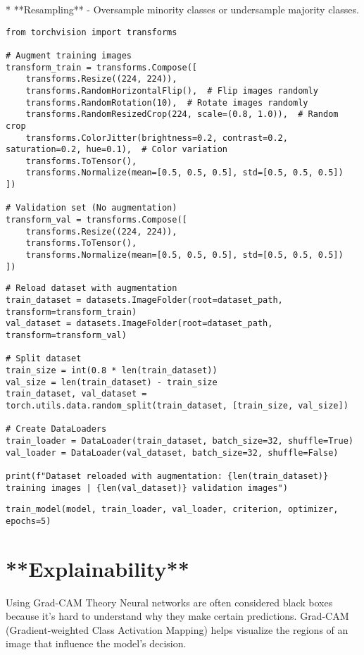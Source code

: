 \documentclass{article}
\begin{document}
*  **Resampling** - Oversample minority classes or undersample majority classes.

\begin{verbatim}
from torchvision import transforms

# Augment training images
transform_train = transforms.Compose([
    transforms.Resize((224, 224)),
    transforms.RandomHorizontalFlip(),  # Flip images randomly
    transforms.RandomRotation(10),  # Rotate images randomly
    transforms.RandomResizedCrop(224, scale=(0.8, 1.0)),  # Random crop
    transforms.ColorJitter(brightness=0.2, contrast=0.2, saturation=0.2, hue=0.1),  # Color variation
    transforms.ToTensor(),
    transforms.Normalize(mean=[0.5, 0.5, 0.5], std=[0.5, 0.5, 0.5])
])

# Validation set (No augmentation)
transform_val = transforms.Compose([
    transforms.Resize((224, 224)),
    transforms.ToTensor(),
    transforms.Normalize(mean=[0.5, 0.5, 0.5], std=[0.5, 0.5, 0.5])
])
\end{verbatim}

\begin{verbatim}
# Reload dataset with augmentation
train_dataset = datasets.ImageFolder(root=dataset_path, transform=transform_train)
val_dataset = datasets.ImageFolder(root=dataset_path, transform=transform_val)

# Split dataset
train_size = int(0.8 * len(train_dataset))
val_size = len(train_dataset) - train_size
train_dataset, val_dataset = torch.utils.data.random_split(train_dataset, [train_size, val_size])

# Create DataLoaders
train_loader = DataLoader(train_dataset, batch_size=32, shuffle=True)
val_loader = DataLoader(val_dataset, batch_size=32, shuffle=False)

print(f"Dataset reloaded with augmentation: {len(train_dataset)} training images | {len(val_dataset)} validation images")

\end{verbatim}

\begin{verbatim}
train_model(model, train_loader, val_loader, criterion, optimizer, epochs=5)

\end{verbatim}

\section{**Explainability**}

 Using Grad-CAM Theory Neural networks are often considered black boxes because it's hard to understand why they make certain predictions. Grad-CAM (Gradient-weighted Class Activation Mapping) helps visualize the regions of an image that influence the model’s decision.
\end{document}
